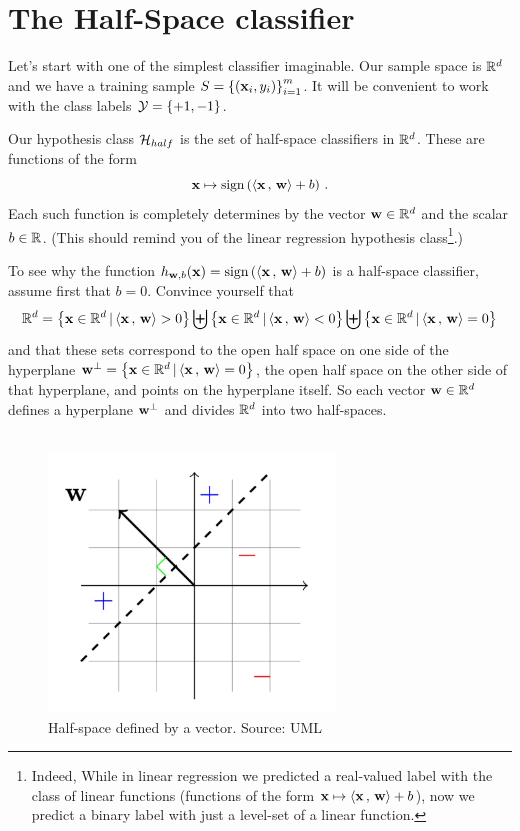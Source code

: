 
\section{The Half-Space classifier}

Let's start with one of the simplest classifier imaginable. Our sample space is
$\mathbb{R}^d$ and we have a training sample $S=\left\{ \left( \mathbf{x}_i,y_i \right)
\right\}_{i=1}^m$. It will be convenient to work with the class labels
$\mathcal{Y}=\left\{ +1,-1 \right\}$. 

Our hypothesis class $\mathcal{H}_{half}$ is the set of half-space classifiers in
$\mathbb{R}^d$. These are functions of the form
\[
\mathbf{x} \mapsto \text{sign}\left( {\left\langle \mathbf{x}\,,\,\mathbf{w} \right\rangle} + b \right)\,.
\]
Each such function is completely determines by the vector $\mathbf{w}\in\mathbb{R}^d$
and the scalar $b\in\mathbb{R}$. (This should remind you of the linear regression
  hypothesis class\footnote{Indeed, While in linear regression we predicted a
  real-valued label with the class
  of linear functions (functions of the form $\mathbf{x} \mapsto
  {\left\langle \mathbf{x}\,,\,\mathbf{w} \right\rangle} + b$), now we predict a binary label with just a
level-set of a linear function.}.)

To see why the function $h_{\mathbf{w},b}(\mathbf{x}) = \text{sign}\left(
{\left\langle \mathbf{x}\,,\,\mathbf{w} \right\rangle} + b \right)$ is a half-space classifier, assume first
that $b=0$. Convince yourself that 
\[
  \mathbb{R}^d = \left\{ \mathbf{x}\in\mathbb{R}^d \,|\, {\left\langle \mathbf{x}\,,\,\mathbf{w} \right\rangle} > 0 \right\} \biguplus 
  \left\{ \mathbf{x}\in\mathbb{R}^d \,|\, {\left\langle \mathbf{x}\,,\,\mathbf{w} \right\rangle} < 0 \right\} \biguplus 
  \left\{ \mathbf{x}\in\mathbb{R}^d \,|\, {\left\langle \mathbf{x}\,,\,\mathbf{w} \right\rangle} = 0 \right\}
\]
and that these sets correspond to the open half space on one side of the
hyperplane $\mathbf{w}^\perp = \left\{ \mathbf{x}\in\mathbb{R}^d \,|\, {\left\langle \mathbf{x}\,,\,\mathbf{w} \right\rangle} = 0
\right\}$, the open half space on the other side of that hyperplane, and points
on the hyperplane itself. So each vector $\mathbf{w}\in\mathbb{R}^d$ defines a
hyperplane $\mathbf{w}^\perp$ and divides $\mathbb{R}^d$ into two half-spaces. 
\\~\\
\begin{figure}[h!]
  \centering
  \includegraphics[width=3in]{half.pdf}
  \caption{Half-space defined by a vector. Source: UML}
\end{figure}

